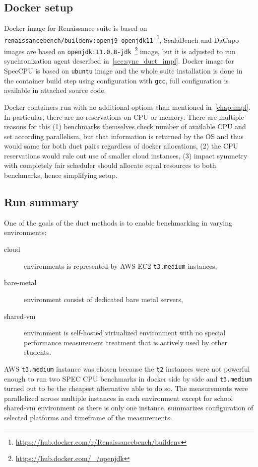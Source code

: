 \subsection{Docker setup}
Docker image for Renaissance suite is based on \lstinline{renaissancebench/buildenv:openj9-openjdk11}~\footnote{\url{https://hub.docker.com/r/Renaissancebench/buildenv}}, ScalaBench and DaCapo images are based on \lstinline{openjdk:11.0.8-jdk}~\footnote{\url{https://hub.docker.com/_/openjdk}} image, but it is adjusted to run synchronization agent described in~\cref{sec:sync_duet_impl}.
Docker image for SpecCPU is based on \lstinline{ubuntu} image and the whole suite installation is done in the container build step using configuration with \lstinline{gcc}, full configuration is available in attached source code.

Docker containers run with no additional options than mentioned in~\cref{chap:impl}.
In particular, there are no reservations on CPU or memory.
There are multiple reasons for this (1) benchmarks themselves check number of available CPU and set according parallelism, but that information is returned by the OS and thus would same for both duet pairs regardless of docker allocations, (2) the CPU reservations would rule out use of smaller cloud instances, (3) impact symmetry with completely fair scheduler should allocate equal resources to both benchmarks, hence simplifying setup.

\subsection{Run summary}

One of the goals of the duet methods is to enable benchmarking in varying environments:
\begin{description}
	\item[cloud] environments is represented by AWS EC2 \lstinline{t3.medium} instances,
	\item[bare-metal] environment consist of dedicated bare metal servers,
	\item[shared-vm] environment is self-hosted virtualized environment with no special performance measurement treatment that is actively used by other students.
\end{description}
AWS \lstinline{t3.medium} instance was chosen because the \lstinline{t2} instances were not powerful enough to run two SPEC CPU benchmarks in docker side by side and \lstinline{t3.medium} turned out to be the cheapest alternative able to do so.
The measurements were parallelized across multiple instances in each environment except for school shared-vm environment as there is only one instance.
 summarizes configuration of selected platforms and timeframe of the measurements.

